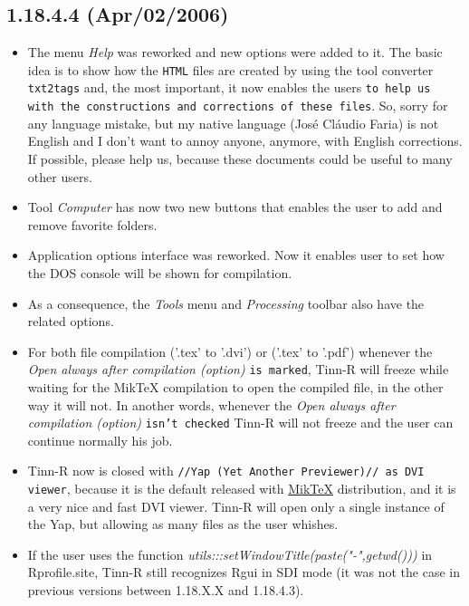 \subsection*{1.18.4.4 (Apr/02/2006)}
\begin{itemize}
  \item The menu \textit{Help} was reworked and new options were added to it.
    The basic idea is to show how the \texttt{HTML} files are created
    by using the tool converter \texttt{txt2tags} and, the most important,
    it now enables the users \texttt{to help us with the constructions and
      corrections of these files}. So, sorry for any language mistake, but my
    native language (José Cláudio Faria) is not English and I don't want
    to annoy anyone, anymore, with English corrections. If possible,
    please help us, because these documents could be useful to many other users.
  \item Tool \textit{Computer} has now two new buttons that enables the user
    to add and remove favorite folders.
  \item Application options interface was reworked. Now it enables user
    to set how the DOS console will be shown for compilation.
  \item As a consequence, the \textit{Tools} menu and \textit{Processing}
    toolbar also have the related options.
  \item For both file compilation ('.tex' to '.dvi') or ('.tex' to '.pdf')
    whenever the \textit{Open always after compilation (option)} \texttt{is
      marked}, Tinn-R will freeze while waiting for the MikTeX compilation
    to open the compiled file, in the other way it will not. In another
    words, whenever the \textit{Open always after compilation (option)}
    \texttt{isn't checked} Tinn-R will not freeze and the user can continue
    normally his job.
  \item Tinn-R now is closed with \texttt{//Yap (Yet Another Previewer)// as
      DVI viewer}, because it is the default released with
    \href{http://www.miktex.org}{MikTeX}
    distribution, and it is a very nice and fast DVI viewer.
    Tinn-R will open only a single instance of the Yap, but allowing as
    many files as the user whishes.
  \item If the user uses the function
    \textit{utils:::setWindowTitle(paste("-",getwd()))} in Rprofile.site,
    Tinn-R still recognizes Rgui in SDI mode (it was not the case in previous
    versions between 1.18.X.X and 1.18.4.3).
\end{itemize}


